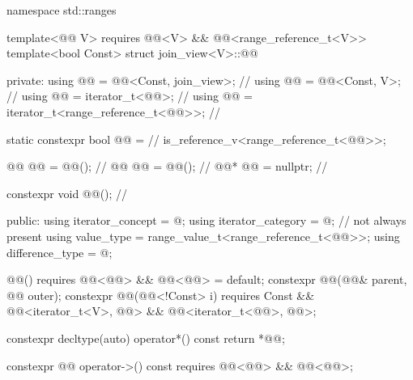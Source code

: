 %
\begin{codeblock}
namespace std::ranges {
  template<@@ V>
    requires @@<V> && @@<range_reference_t<V>>
  template<bool Const>
  struct join_view<V>::@@ {
  private:
    using @@    = @@<Const, join_view>;            // \expos
    using @@      = @@<Const, V>;                    // \expos
    using @@ = iterator_t<@@>;                         // \expos
    using @@ = iterator_t<range_reference_t<@@>>;      // \expos

    static constexpr bool @@ =                      // \expos
      is_reference_v<range_reference_t<@@>>;

    @@ @@ = @@();                             // \expos
    @@ @@ = @@();                             // \expos
    @@* @@  = nullptr;                                 // \expos

    constexpr void @@();                                   // \expos

  public:
    using iterator_concept  = @\seebelow@;
    using iterator_category = @\seebelow@;                        // not always present
    using value_type        = range_value_t<range_reference_t<@@>>;
    using difference_type   = @\seebelow@;

    @@() requires @@<@@> &&
                         @\itcorr[-2]@<@@> = default;
    constexpr @@(@@& parent, @@ outer);
    constexpr @@(@@<!Const> i)
      requires Const &&
               @@<iterator_t<V>, @@> &&
               @@<iterator_t<@@>, @@>;

    constexpr decltype(auto) operator*() const { return *@@; }

    constexpr @@ operator->() const
      requires @@<@@> && @@<@@>;

}}
\end{codeblock}
